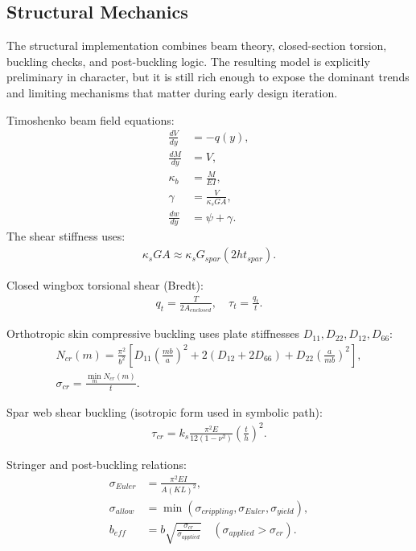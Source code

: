 \subsection{Structural Mechanics}
The structural implementation combines beam theory, closed-section torsion, buckling checks, and post-buckling logic. The resulting model is explicitly preliminary in character, but it is still rich enough to expose the dominant trends and limiting mechanisms that matter during early design iteration.

Timoshenko beam field equations:
\begin{align}
\frac{dV}{dy} &= -q(y), \\
\frac{dM}{dy} &= V, \\
\kappa_b &= \frac{M}{EI}, \\
\gamma &= \frac{V}{\kappa_s G A}, \\
\frac{dw}{dy} &= \psi + \gamma.
\end{align}
The shear stiffness uses:
\begin{align}
\kappa_s G A \approx \kappa_s G_{spar}\left(2 h t_{spar}\right).
\end{align}

Closed wingbox torsional shear (Bredt):
\begin{align}
q_t = \frac{T}{2A_{enclosed}}, \quad
\tau_t = \frac{q_t}{t}.
\end{align}

Orthotropic skin compressive buckling uses plate stiffnesses \(D_{11},D_{22},D_{12},D_{66}\):
\begin{align}
N_{cr}(m)=\frac{\pi^2}{b^2}\left[D_{11}\left(\frac{mb}{a}\right)^2 + 2(D_{12}+2D_{66}) + D_{22}\left(\frac{a}{mb}\right)^2\right], \\
\sigma_{cr}=\frac{\min_m N_{cr}(m)}{t}.
\end{align}

Spar web shear buckling (isotropic form used in symbolic path):
\begin{align}
\tau_{cr}=k_s\frac{\pi^2E}{12(1-\nu^2)}\left(\frac{t}{h}\right)^2.
\end{align}

Stringer and post-buckling relations:
\begin{align}
\sigma_{Euler} &= \frac{\pi^2 E I}{A (K L)^2}, \\
\sigma_{allow} &= \min(\sigma_{crippling}, \sigma_{Euler}, \sigma_{yield}), \\
b_{eff} &= b\sqrt{\frac{\sigma_{cr}}{\sigma_{applied}}}\quad(\sigma_{applied}>\sigma_{cr}).
\end{align}

